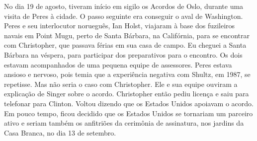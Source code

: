 No dia 19 de agosto, tiveram início em sigilo os Acordos de Oslo,
durante uma visita de Peres à cidade. O passo seguinte era conseguir o
aval de Washington. Peres e seu interlocutor norueguês, Ian Holst,
viajaram à base dos fuzileiros navais em Point Mugu, perto de Santa
Bárbara, na Califórnia, para se encontrar com Christopher, que passava
férias em sua casa de campo. Eu cheguei a Santa Bárbara na véspera, para
participar dos preparativos para o encontro. Os dois estavam acompanhados de
uma pequena equipe de assessores. Peres estava ansioso e nervoso, pois
temia que a experiência negativa com Shultz, em 1987, se repetisse. Mas
não seria o caso com Christopher. Ele e sua equipe ouviram a explicação
de Singer sobre o acordo. Christopher então pediu licença e saiu para
telefonar para Clinton. Voltou dizendo que os Estados Unidos apoiavam o
acordo. Em pouco tempo, ficou decidido que os Estados Unidos se
tornariam um parceiro ativo e seriam também os anfitriões da cerimônia
de assinatura, nos jardins da Casa Branca, no dia 13 de setembro.

